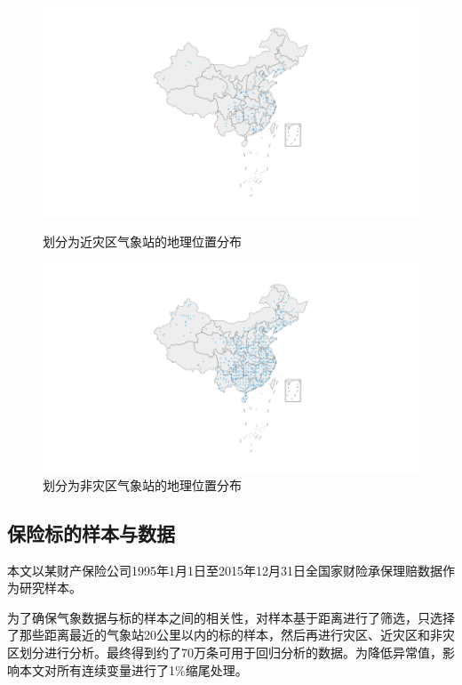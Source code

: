 \begin{figure}[H]
    \begin{minipage}{0.48\linewidth}
        \includegraphics[width=\textwidth, trim=200 0 200 0]{lib/img/middle.png}
        \caption{划分为近灾区气象站的地理位置分布}
    \end{minipage}
    \begin{minipage}{0.48\linewidth}
        \includegraphics[width=\textwidth, trim=200 0 200 0]{lib/img/far.png}
        \caption{划分为非灾区气象站的地理位置分布}
        \label{fig:end}
    \end{minipage}
\end{figure}
\subsection{保险标的样本与数据}\label{sec:data}
本文以某财产保险公司1995年1月1日至2015年12月31日全国家财险承保理赔数据作为研究样本。

为了确保气象数据与标的样本之间的相关性，对样本基于距离进行了筛选，只选择了那些距离最近的气象站20公里以内的标的样本，然后再进行灾区、近灾区和非灾区划分进行分析。最终得到约了70万条可用于回归分析的数据。为降低异常值，影响本文对所有连续变量进行了1\%缩尾处理。

